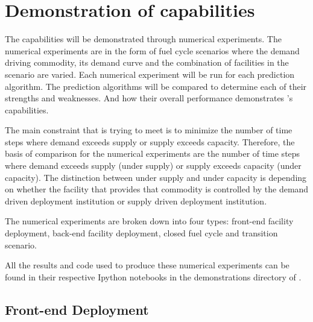 \section{Demonstration of \deploy capabilities}
The \deploy capabilities will be demonstrated through numerical
experiments. 
The numerical experiments are in the form of fuel cycle scenarios 
where the demand driving commodity, its demand curve and the 
combination of facilities in the scenario are varied. 
Each numerical experiment will be run for each prediction
algorithm. 
The prediction algorithms will be compared to determine each 
of their strengths and weaknesses. 
And how their overall performance demonstrates \deploy's 
capabilities. 

The main constraint that \deploy is trying to meet is to 
minimize the number of time steps where demand exceeds supply or 
supply exceeds capacity. 
Therefore, the basis of comparison for the numerical experiments 
are the number of time steps where demand exceeds supply (under 
supply) or supply exceeds capacity (under capacity). 
The distinction between under supply and under capacity is 
depending on whether the facility that provides that commodity 
is controlled by the demand driven deployment institution or 
supply driven deployment institution. 

The numerical experiments are broken down into four types: 
front-end facility deployment, back-end facility deployment, 
closed fuel cycle and transition scenario. 

All the results and code used to produce these numerical 
experiments can be found in their respective Ipython
notebooks in the demonstrations directory of \cite{deploydoi_2019}. 

\subsection{Front-end Deployment}

